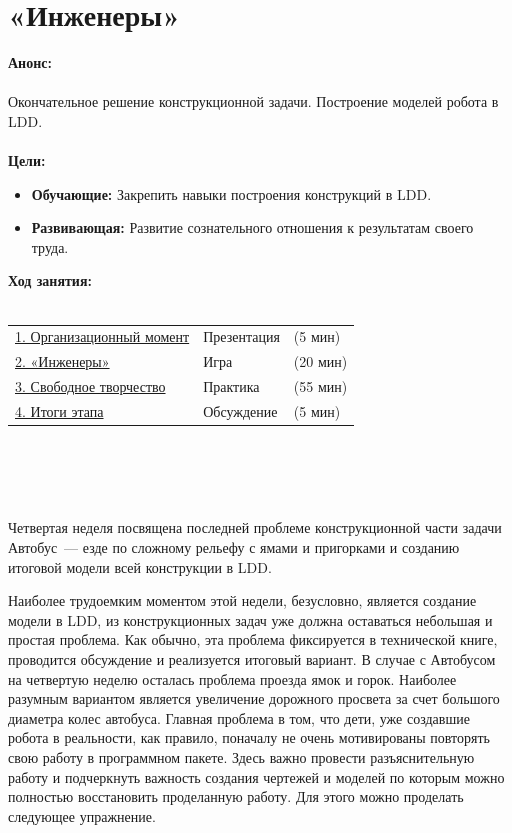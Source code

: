 \chapter{«Инженеры»}
{\bfseries Анонс:}\\\\
Окончательное решение конструкционной задачи. Построение моделей робота в LDD.\\\\
{\bfseries Цели:}
\begin{itemize}
	\item{}{\bfseries Обучающие:} Закрепить навыки построения конструкций в LDD.  
	\item{}{\bfseries Развивающая:} Развитие сознательного отношения к результатам своего труда.\\
\end{itemize}	
{\bfseries Ход занятия:}\\\\
\begin{tabular}[h!]{lll}
	{\hyperlink{lesson27x1}{1. Организационный момент}}&{Презентация}&{(5 мин)}\\
	{\hyperlink{lesson27x2}{2. «Инженеры»}}&{Игра}&{(20 мин)}\\
	{\hyperlink{lesson27x3}{3. Свободное творчество}}&{Практика}&{(55 мин)}\\
	{\hyperlink{lesson27x4}{4. Итоги этапа}}&{Обсуждение}&{(5 мин)}\\
\end{tabular}\\\\

{\hypertarget{lesson27x1}{}}\\\\

Четвертая неделя посвящена  последней проблеме конструкционной части задачи Автобус~--- езде по сложному рельефу с ямами и пригорками  и созданию итоговой модели всей конструкции в LDD.

Наиболее трудоемким моментом этой недели, безусловно, является создание модели в LDD, из конструкционных задач уже должна оставаться небольшая и простая проблема. Как обычно, эта проблема фиксируется в технической книге, проводится обсуждение и реализуется итоговый вариант. В случае с Автобусом на четвертую неделю осталась проблема проезда ямок и горок. Наиболее разумным вариантом является увеличение дорожного просвета за счет большого диаметра колес автобуса.
Главная проблема в том, что дети, уже создавшие робота в реальности, как правило, поначалу не очень мотивированы повторять свою работу в программном пакете. Здесь важно провести разъяснительную работу и подчеркнуть важность создания чертежей и моделей по которым можно полностью восстановить проделанную работу. Для этого можно проделать следующее упражнение.\\\\

